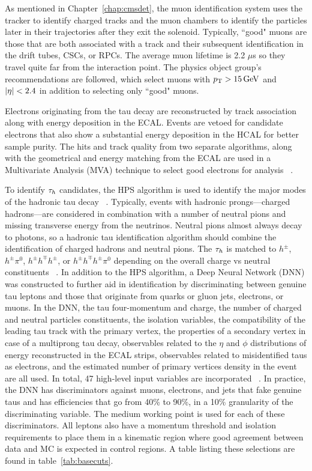 As mentioned in Chapter~\ref{chap:cmsdet}, the muon identification system uses the tracker to identify charged tracks and the muon chambers to identify the particles later in their trajectories after they exit the solenoid. Typically, ``good" muons are those that are both associated with a track and their subsequent identification in the drift tubes, CSCs, or RPCs. The average muon lifetime is 2.2 $\mu$s so they travel quite far from the interaction point.  The physics object group's recommendations are followed, which select muons with $p_{\mathrm{T}}>15\,\text{Ge\hspace{-.08em}V}$ and $\lvert \eta \rvert<2.4$ in addition to selecting only ``good" muons.

Electrons originating from the tau decay are reconstructed by track association along with energy deposition in the ECAL. Events are vetoed for candidate electrons that also show a substantial energy deposition in the HCAL for better sample purity. The hits and track quality from two separate algorithms, along with the geometrical and energy matching from the ECAL are used in a Multivariate Analysis (MVA) technique to select good electrons for analysis 
~\cite{Khachatryan:2015hwa}.

To identify $\tau_h$ candidates, the HPS algorithm is used to identify the major modes of the hadronic tau decay ~\cite{Sirunyan_2018}. Typically, events with hadronic prongs---charged hadrons---are considered in combination with a number of neutral pions and missing transverse energy from the neutrinos. Neutral pions almost always decay to photons, so a hadronic tau identification algorithm should combine the identification of charged hadrons and neutral pions. 
The $\tau_h$ is matched to $h^{\pm}$, $h^{\pm}\pi^{0}$, $h^{\pm}h^{\mp}h^{\pm}$, or $h^{\pm}h^{\mp}h^{\pm}\pi^{0}$ depending on the overall charge vs neutral constituents ~\cite{Sirunyan:2018pgf,Hassanshahi:2797703}.
In addition to the HPS algorithm, a Deep Neural Network (DNN) was constructed to further aid in identification by discriminating between genuine tau leptons and those that originate from quarks or gluon jets, electrons, or muons.  
In the DNN, the tau four-momentum and charge,
the number of charged and neutral particles constituents,
the isolation variables,
the compatibility of the leading tau track with the primary vertex,
the properties of a secondary vertex in case of a multiprong tau decay,
observables related to the $\eta$ and $\phi$ distributions of energy reconstructed in the ECAL strips,
observables related to misidentified taus as electrons, 
and the estimated number of primary vertices density in the event are all used. In total, 47 high-level input variables are incorporated 
~\cite{https://doi.org/10.48550/arxiv.2201.08458}.
In practice, the DNN has discriminators against muons, electrons, and jets that fake genuine taus and has efficiencies that go from 40\% to 90\%, in a 10\% granularity of the discriminating variable. The medium working point is used for each of these discriminators. 
All leptons also have a momentum threshold and isolation requirements to place them in a kinematic region where good agreement between data and MC is expected in control regions. A table listing these selections are found in table~\ref{tab:basecuts}.

